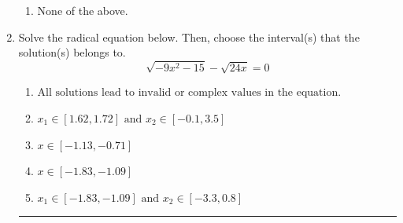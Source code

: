 \documentclass[14pt]{extbook}
\newcommand{\litem}[1]{\item#1\hspace*{-1cm}\rule{\textwidth}{0.4pt}}
\begin{document}
\begin{enumerate}
{\begin{enumerate}[label=\Alph*.]
\item None of the above.
\end{enumerate} }
\litem{
Solve the radical equation below. Then, choose the interval(s) that the solution(s) belongs to.\[ \sqrt{-9 x^2 - 15} - \sqrt{24 x} = 0 \]\begin{enumerate}[label=\Alph*.]
\item \( \text{All solutions lead to invalid or complex values in the equation.} \)
\item \( x_1 \in [1.62, 1.72] \text{ and } x_2 \in [-0.1,3.5] \)
\item \( x \in [-1.13,-0.71] \)
\item \( x \in [-1.83,-1.09] \)
\item \( x_1 \in [-1.83, -1.09] \text{ and } x_2 \in [-3.3,0.8] \)


\end{enumerate}}
\end{enumerate}
\end{document}
